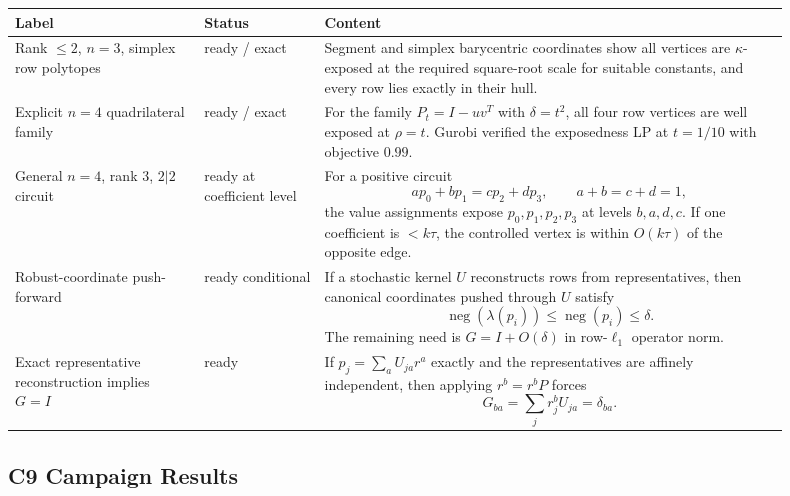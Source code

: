 \documentclass[11pt]{article}
\newcommand{\negm}{\operatorname{neg}}
\newcommand{\status}[1]{\textsf{#1}}
\newcommand{\ready}{\status{ready}}
\theoremstyle{definition}
\begin{document}
\begin{longtable}{p{0.22\linewidth}p{0.14\linewidth}p{0.54\linewidth}}
\toprule
Label & Status & Content\\
\midrule
\endhead
Rank \(\leq2\), \(n=3\), simplex row polytopes &
\ready{} / exact &
Segment and simplex barycentric coordinates show all vertices are
\(\kappa\)-exposed at the required square-root scale for suitable constants,
and every row lies exactly in their hull.\\
\addlinespace
Explicit \(n=4\) quadrilateral family &
\ready{} / exact &
For the family \(P_t=I-uv^T\) with \(\delta=t^2\), all four row vertices are
well exposed at \(\rho=t\).  Gurobi verified the exposedness LP at
\(t=1/10\) with objective \(0.99\).\\
\addlinespace
General \(n=4\), rank \(3\), \(2|2\) circuit &
\ready{} at coefficient level &
For a positive circuit
\[
  a p_0+b p_1=c p_2+d p_3,\qquad a+b=c+d=1,
\]
the value assignments expose \(p_0,p_1,p_2,p_3\) at levels \(b,a,d,c\).
If one coefficient is \(<k\tau\), the controlled vertex is within
\(O(k\tau)\) of the opposite edge.\\
\addlinespace
Robust-coordinate push-forward &
\ready{} conditional &
If a stochastic kernel \(U\) reconstructs rows from representatives, then
canonical coordinates pushed through \(U\) satisfy
\[
  \negm(\lambda(p_i))\leq\negm(p_i)\leq\delta.
\]
The remaining need is \(G=I+O(\delta)\) in row-\(\ell_1\) operator norm.\\
\addlinespace
Exact representative reconstruction implies \(G=I\) &
\ready{} &
If \(p_j=\sum_aU_{ja}r^a\) exactly and the representatives are affinely
independent, then applying \(r^b=r^bP\) forces
\[
  G_{ba}=\sum_jr^b_jU_{ja}=\delta_{ba}.
\]\\
\bottomrule
\end{longtable}

\subsection{C9 Campaign Results}
\end{document}
